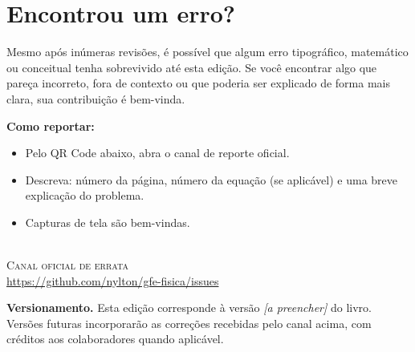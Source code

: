 
\chapter*{Encontrou um erro?}

Mesmo após inúmeras revisões, é possível que algum erro tipográfico,
matemático ou conceitual tenha sobrevivido até esta edição. Se você
encontrar algo que pareça incorreto, fora de contexto ou que poderia
ser explicado de forma mais clara, sua contribuição é bem-vinda.

\vspace{1em}

\noindent\textbf{Como reportar:}

\begin{itemize}
  \item Pelo QR Code abaixo, abra o canal de reporte oficial.
  \item Descreva: número da página, número da equação (se aplicável)
  e uma breve explicação do problema.
  \item Capturas de tela são bem-vindas.
\end{itemize}

\vspace{2em}

\begin{center}
\\[0.5em]
{\footnotesize\scshape Canal oficial de errata}\\[0.5em]
{\footnotesize\url{https://github.com/nylton/gfe-fisica/issues}}
\end{center}

\vspace{2em}

\noindent\textbf{Versionamento.} Esta edição corresponde à versão
\textit{[a preencher]} do livro. Versões futuras incorporarão as
correções recebidas pelo canal acima, com créditos aos colaboradores
quando aplicável.

\clearpage
